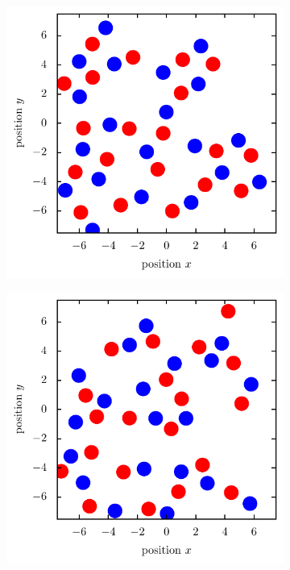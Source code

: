 \documentclass[11pt, a4paper]{article}
\numberwithin{equation}{section}
\begin{document}
\begin{figure}[hp]
\begin{subfigure}[t]{0.48\textwidth}
		\label{fig:coulomb_crystal_defects}
		\vspace*{0.3cm}
	\end{subfigure}
	\begin{subfigure}[t]{0.48\textwidth}
		\centering
		\includegraphics[width=\textwidth]{figures/Fluid_1_beta_40.pdf}
		\label{fig:coulomb_amorphous}
		\vspace*{0.3cm}
	\end{subfigure}
	\hfill
	\begin{subfigure}[t]{0.48\textwidth}
		\centering
		\includegraphics[width=\textwidth]{figures/Gas_1_beta_10.pdf}

\end{subfigure}
\end{figure}
\end{document}
